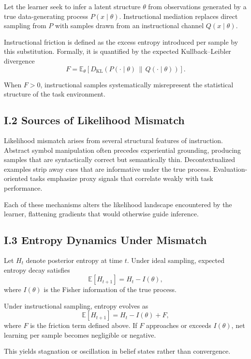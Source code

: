 \documentclass[11pt]{article}
\begin{document}
Let the learner seek to infer a latent structure \(\theta\) from observations generated by a true data-generating process \(P(x \mid \theta)\). Instructional mediation replaces direct sampling from \(P\) with samples drawn from an instructional channel \(Q(x \mid \theta)\).

Instructional friction is defined as the excess entropy introduced per sample by this substitution. Formally, it is quantified by the expected Kullback–Leibler divergence
\[
F = \mathbb{E}_{\theta}\!\left[D_{\mathrm{KL}}\!\left(P(\cdot \mid \theta)\,\|\,Q(\cdot \mid \theta)\right)\right].
\]

When \(F > 0\), instructional samples systematically misrepresent the statistical structure of the task environment.

\subsection{I.2 Sources of Likelihood Mismatch}

Likelihood mismatch arises from several structural features of instruction. Abstract symbol manipulation often precedes experiential grounding, producing samples that are syntactically correct but semantically thin. Decontextualized examples strip away cues that are informative under the true process. Evaluation-oriented tasks emphasize proxy signals that correlate weakly with task performance.

Each of these mechanisms alters the likelihood landscape encountered by the learner, flattening gradients that would otherwise guide inference.

\subsection{I.3 Entropy Dynamics Under Mismatch}

Let \(H_t\) denote posterior entropy at time \(t\). Under ideal sampling, expected entropy decay satisfies
\[
\mathbb{E}[H_{t+1}] = H_t - I(\theta),
\]
where \(I(\theta)\) is the Fisher information of the true process.

Under instructional sampling, entropy evolves as
\[
\mathbb{E}[H_{t+1}] = H_t - I(\theta) + F,
\]
where \(F\) is the friction term defined above. If \(F\) approaches or exceeds \(I(\theta)\), net learning per sample becomes negligible or negative.

This yields stagnation or oscillation in belief states rather than convergence.
\end{document}
